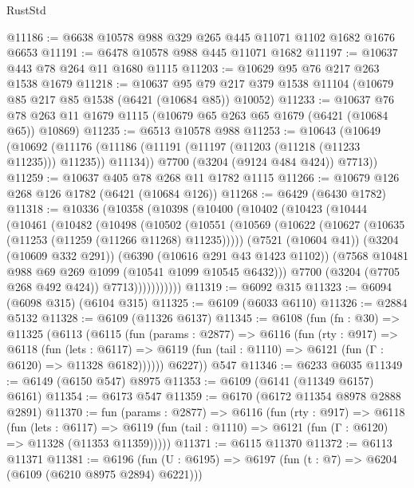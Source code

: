 \begin{lexlean}{RustStd}
\begin{coremodule}
@11186 := @6638 @10578 @988 @329 @265 @445 @11071 @1102 @1682 @1676 @6653
@11191 := @6478 @10578 @988 @445 @11071 @1682
@11197 := @10637 @443 @78 @264 @11 @1680 @1115
@11203 := @10629 @95 @76 @217 @263 @1538 @1679
@11218 := @10637
    @95
    @79
    @217
    @379
    @1538
    @11104
    (@10679 @85 @217 @85 @1538 (@6421 (@10684 @85)) @10052)
@11233 := @10637
    @76
    @78
    @263
    @11
    @1679
    @1115
    (@10679 @65 @263 @65 @1679 (@6421 (@10684 @65)) @10869)
@11235 := @6513 @10578 @988
@11253 := @10643
    (@10649
      (@10692
        (@11176 (@11186 (@11191 (@11197 (@11203 (@11218 (@11233 @11235))) @11235)) @11134))
        @7700
        (@3204 (@9124 @484 @424))
        @7713))
@11259 := @10637 @405 @78 @268 @11 @1782 @1115
@11266 := @10679 @126 @268 @126 @1782 (@6421 (@10684 @126))
@11268 := @6429 (@6430 @1782)
@11318 := @10336
    (@10358
      (@10398
        (@10400
          (@10402
            (@10423
              (@10444
                (@10461
                  (@10482
                    (@10498
                      (@10502
                        (@10551
                          (@10569
                            (@10622 (@10627 (@10635 (@11253 (@11259 (@11266 @11268) @11235)))))
                            (@7521 (@10604 @41))
                            (@3204 (@10609 @332 @291))
                            (@6390 (@10616 @291 @43 @1423 @1102))
                            (@7568 @10481 @988 @69 @269 @1099 (@10541 @1099 @10545 @6432)))
                          @7700
                          (@3204 (@7705 @268 @492 @424))
                          @7713)))))))))))
@11319 := @6092 @315
@11323 := @6094 (@6098 @315) (@6104 @315)
@11325 := @6109 (@6033 @6110)
@11326 := @2884 @5132
@11328 := @6109 (@11326 @6137)
@11345 := @6108
    (fun (fn : @30) =>
    @11325
      (@6113
        (@6115
          (fun (params : @2877) =>
          @6116
            (fun (rty : @917) =>
            @6118
              (fun (lets : @6117) =>
              @6119 (fun (tail : @1110) => @6121 (fun (Γ : @6120) => @11328 @6182))))))
        @6227))
    @547
@11346 := @6233 @6035
@11349 := @6149 (@6150 @547) @8975
@11353 := @6109 (@6141 (@11349 @6157) @6161)
@11354 := @6173 @547
@11359 := @6170 (@6172 @11354 @8978 @2888 @2891)
@11370 := fun (params : @2877) =>
  @6116
    (fun (rty : @917) =>
    @6118
      (fun (lets : @6117) =>
      @6119 (fun (tail : @1110) => @6121 (fun (Γ : @6120) => @11328 (@11353 @11359)))))
@11371 := @6115 @11370
@11372 := @6113 @11371
@11381 := @6196 (fun (U : @6195) => @6197 (fun (t : @7) => @6204 (@6109 (@6210 @8975 @2894) @6221)))

\end{coremodule}
\end{lexlean}
